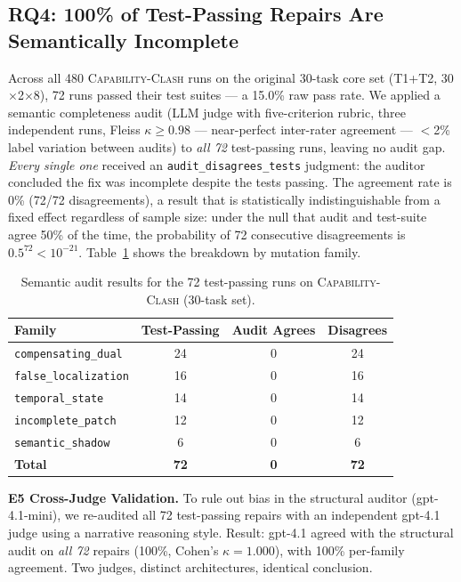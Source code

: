 \documentclass[sigconf,review,anonymous]{acmart}
\newcommand{\ccbench}{\textsc{Capability-Clash}}
\begin{document}
\subsection{RQ4: 100\% of Test-Passing Repairs Are Semantically Incomplete}
\label{sec:rq4}

Across all 480 \ccbench{} runs on the original 30-task core set (T1+T2, 30$\times$2$\times$8), 72 runs passed their test suites — a 15.0\% raw pass rate. We applied a semantic completeness audit (LLM judge with five-criterion rubric, three independent runs, Fleiss $\kappa \geq 0.98$ — near-perfect inter-rater agreement — $<$2\% label variation between audits) to \emph{all 72} test-passing runs, leaving no audit gap. \emph{Every single one} received an \texttt{audit\_disagrees\_tests} judgment: the auditor concluded the fix was incomplete despite the tests passing. The agreement rate is 0\% (72/72 disagreements), a result that is statistically indistinguishable from a fixed effect regardless of sample size: under the null that audit and test-suite agree 50\% of the time, the probability of 72 consecutive disagreements is $0.5^{72} < 10^{-21}$. Table~\ref{tab:audit} shows the breakdown by mutation family.

\begin{table}[t]
\centering
\caption{Semantic audit results for the 72 test-passing runs on \ccbench{} (30-task set).}
\label{tab:audit}
\small
\begin{tabular}{lccc}
\toprule
Family & Test-Passing & Audit Agrees & Disagrees \\
\midrule
\texttt{compensating\_dual} & 24 & 0 & 24 \\
\texttt{false\_localization} & 16 & 0 & 16 \\
\texttt{temporal\_state}     & 14 & 0 & 14 \\
\texttt{incomplete\_patch}   & 12 & 0 & 12 \\
\texttt{semantic\_shadow}    &  6 & 0 &  6 \\
\midrule
\textbf{Total} & \textbf{72} & \textbf{0} & \textbf{72} \\
\bottomrule
\end{tabular}
\end{table}

\textbf{E5 Cross-Judge Validation.} To rule out bias in the structural auditor (gpt-4.1-mini), we re-audited all 72 test-passing repairs with an independent gpt-4.1 judge using a narrative reasoning style. Result: gpt-4.1 agreed with the structural audit on \emph{all 72} repairs (100\%, Cohen's $\kappa=1.000$), with 100\% per-family agreement. Two judges, distinct architectures, identical conclusion.
\end{document}
